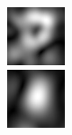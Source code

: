 \begin{figure}[ht]
\begin{center}
 \includegraphics[width=\columnwidth/9]{ch4/figures/mag_2_7.jpg}\\
 \includegraphics[width=\columnwidth/9]{ch4/figures/mag_3_0.jpg}

\end{center}
\end{figure}
